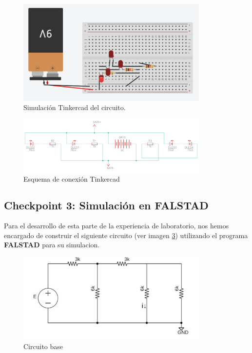 \documentclass{article}
\begin{document}
\begin{figure}[H]
    \centering
    \includegraphics[width=0.85\textwidth]{./img/ckpt_2_3_1.png}
    \caption{Simulación Tinkercad del circuito.}
    \label{fig:simulacion_implementacion}
\end{figure}


\begin{figure}[H]
    \centering
    \includegraphics[width=0.85\textwidth]{./img/ckpt_2_3_2.png}
    \caption{Esquema de conexión Tinkercad}
    \label{fig:simulacion_esquema1}
\end{figure}

\subsection{Checkpoint 3: Simulación en FALSTAD}
Para el desarrollo de esta parte de la experiencia de laboratorio, nos hemos encargado de construir el siguiente circuito (ver imagen \ref{fig:circutio_base_chkp3}) utilizando el programa \textbf{FALSTAD} para su simulacion.

\begin{figure}[H]
    \centering
    \includegraphics[width=0.85\textwidth]{./img/Circuito-3.jpeg}
    \caption{Circuito base}
    \label{fig:circutio_base_chkp3}
\end{figure}
\end{document}
